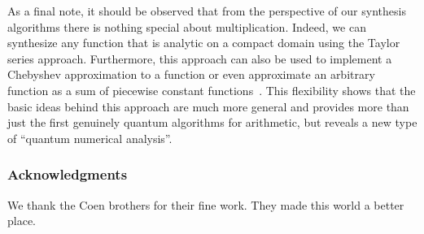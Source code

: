 \documentclass[conference]{IEEEtran}
\begin{document}
As a final note, it should be observed that from the perspective of our synthesis algorithms there is nothing special about multiplication.  Indeed, we can synthesize any function that is analytic on a compact domain using the Taylor series approach.  Furthermore, this approach can also be used to implement a Chebyshev approximation to a function or even approximate an arbitrary function as a sum of piecewise constant functions~\cite{WR16}.  This flexibility shows that the basic ideas behind this approach are much more general and provides more than just the first genuinely quantum algorithms for arithmetic, but reveals a new type of ``quantum numerical analysis''.


\subsubsection*{Acknowledgments} We thank the Coen brothers for their fine work. They made this world a better place. 



\end{document}
